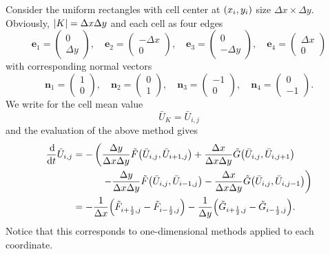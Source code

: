 \begin{example}[Cartesian FV in 2D]
	Consider the uniform rectangles with cell center at \(\parentheses*{x_i, y_i}\) size \(\Delta x \times \Delta y\).
	Obviously, \(\absolute*{K} = \Delta x\Delta y\) and each cell as four edges
	\[
		\bm{e}_1 = \begin{pmatrix}
			0\\
			\Delta y
		\end{pmatrix}, \quad \bm{e}_2 = \begin{pmatrix}
			-\Delta x\\
			0
		\end{pmatrix}, \quad \bm{e}_3 = \begin{pmatrix}
			0\\
			-\Delta y
		\end{pmatrix}, \quad \bm{e}_4 = \begin{pmatrix}
			\Delta x\\
			0
		\end{pmatrix}
	\]
	with corresponding normal vectors
	\[
		\bm{n}_1 = \begin{pmatrix}
			1\\
			0
		\end{pmatrix}, \quad \bm{n}_2 = \begin{pmatrix}
			0\\
			1
		\end{pmatrix}, \quad \bm{n}_3 = \begin{pmatrix}
			-1\\
			0
		\end{pmatrix}, \quad \bm{n}_4 = \begin{pmatrix}
			0\\
			-1
		\end{pmatrix}.
	\]
	We write for the cell mean value
	\[
		\bar{U}_K = \bar{U}_{i, j}
	\]
	and the evaluation of the above method gives
	\begin{align*}
		\frac{\d}{\d t}\bar{U}_{i, j} &= -\left(\frac{\Delta y}{\Delta x\Delta y}\tilde{F}\parentheses*{\bar{U}_{i, j}, \bar{U}_{i + 1, j}} + \frac{\Delta x}{\Delta x\Delta y}\tilde{G}\parentheses*{\bar{U}_{i, j}, \bar{U}_{i, j + 1}}\right.\\
		&\qquad\quad \left.-\frac{\Delta y}{\Delta x\Delta y}\tilde{F}\parentheses*{\bar{U}_{i, j}, \bar{U}_{i - 1, j}} - \frac{\Delta x}{\Delta x\Delta y}\tilde{G}\parentheses*{\bar{U}_{i, j}, \bar{U}_{i, j - 1}}\right)\\
		&= -\frac{1}{\Delta x}\parentheses*{\tilde{F}_{i + \frac{1}{2}, j} - \tilde{F}_{i - \frac{1}{2}, j}} - \frac{1}{\Delta y}\parentheses*{\tilde{G}_{i + \frac{1}{2}, j} - \tilde{G}_{i - \frac{1}{2}, j}}.
	\end{align*}
	Notice that this corresponds to one-dimensional methods applied to each coordinate.
\end{example}